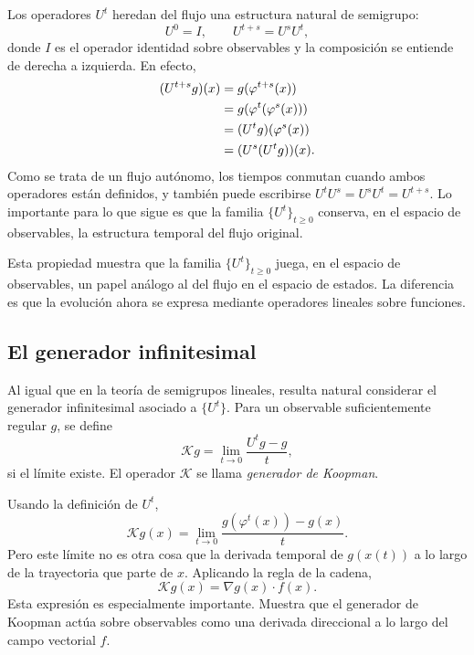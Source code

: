 Los operadores \(U^t\) heredan del flujo una estructura natural de semigrupo:
\begin{equation}
U^0=I,
\qquad
U^{t+s}=U^sU^t,
\label{eq:Koopman_operator_semigroup}
\end{equation}
donde \(I\) es el operador identidad sobre observables y la composición se entiende de derecha a izquierda. En efecto,
\begin{align}
(U^{t+s}g)(x)
&=
g(\varphi^{t+s}(x)) \notag\\
&=
g(\varphi^t(\varphi^s(x))) \notag\\
&=
(U^t g)(\varphi^s(x)) \notag\\
&=
(U^s(U^t g))(x).
\label{eq:Koopman_operator_semigroup_proof}
\end{align}
Como se trata de un flujo autónomo, los tiempos conmutan cuando ambos operadores están definidos, y también puede escribirse \(U^tU^s=U^sU^t=U^{t+s}\). Lo importante para lo que sigue es que la familia \(\{U^t\}_{t\ge 0}\) conserva, en el espacio de observables, la estructura temporal del flujo original.

Esta propiedad muestra que la familia \(\{U^t\}_{t\ge 0}\) juega, en el espacio de observables, un papel análogo al del flujo en el espacio de estados. La diferencia es que la evolución ahora se expresa mediante operadores lineales sobre funciones.

\subsection{El generador infinitesimal}

Al igual que en la teoría de semigrupos lineales, resulta natural considerar el generador infinitesimal asociado a \(\{U^t\}\). Para un observable suficientemente regular \(g\), se define
\begin{equation}
\mathcal{K}g
=
\lim_{t\to 0}\frac{U^t g-g}{t},
\label{eq:Koopman_generator_definition}
\end{equation}
si el límite existe. El operador \(\mathcal{K}\) se llama \emph{generador de Koopman}.

Usando la definición de \(U^t\),
\begin{equation}
\mathcal{K}g(x)
=
\lim_{t\to 0}\frac{g(\varphi^t(x))-g(x)}{t}.
\label{eq:Koopman_generator_limit}
\end{equation}
Pero este límite no es otra cosa que la derivada temporal de \(g(x(t))\) a lo largo de la trayectoria que parte de \(x\). Aplicando la regla de la cadena,
\begin{equation}
\mathcal{K}g(x)
=
\nabla g(x)\cdot f(x).
\label{eq:Koopman_generator_chain_rule}
\end{equation}
Esta expresión es especialmente importante. Muestra que el generador de Koopman actúa sobre observables como una derivada direccional a lo largo del campo vectorial \(f\).

